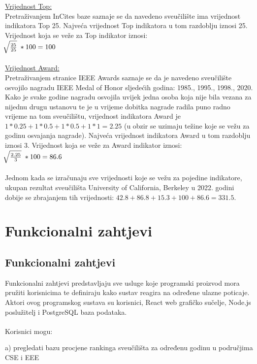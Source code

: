 \documentclass[times, utf8, zavrsni]{fer}
\begin{document}
\\
\\ \underline{Vrijednost Top:} 
\\ Pretraživanjem InCites baze saznaje se da navedeno sveučilište ima vrijednost indikatora Top 25. Najveća vrijednost Top indikatora u tom razdoblju iznosi 25.
Vrijednost koja se veže za Top indikator iznosi: \; \\ $\sqrt[\leftroot{-2}]{\frac{25}{25}} \; * 100 = 100$
\\
\\ \underline{Vrijednost Award:} 
\\ Pretraživanjem stranice IEEE Awards saznaje se da je navedeno sveučilište osvojilo nagradu IEEE Medal of Honor sljedećih godina: 1985., 1995., 1998., 2020. Kako je 
svake godine nagradu osvojila uvijek jedna osoba koja nije bila vezana za nijednu drugu ustanovu te je u vrijeme dobitka nagrade
radila puno radno vrijeme na tom sveučilištu, vrijednost 
indikatora Award je $1*0.25+1*0.5+1*0.5+1*1 = 2.25$ (u obzir se uzimaju težine koje se vežu za godinu osvajanja nagrade). Najveća vrijednost 
indikatora Award u tom razdoblju iznosi 3. Vrijednost koja se veže za Award indikator iznosi: \; \\ $\sqrt[\leftroot{-2}]{\frac{2.25}{3}} \; * 100 = 86.6$
\\\\Jednom kada se izračunaju sve vrijednosti koje se vežu za pojedine indikatore,
ukupan rezultat sveučilišta University of California, Berkeley u 2022. godini dobije se zbrajanjem tih vrijednosti: $42.8+86.8+15.3+100+86.6 = 331.5$.

\chapter{Funkcionalni zahtjevi}
\section{Funkcionalni zahtjevi}
Funkcionalni zahtjevi predstavljaju sve usluge koje programski proizvod mora pružiti korisnicima te definiraju kako sustav reagira na određene ulazne poticaje.
\\ Aktori ovog programskog sustava su korisnici, React web grafičko sučelje, Node.js poslužitelj i PostgreSQL baza podataka.
\\
\\Korisnici mogu:

a) pregledati bazu procjene rankinga sveučilišta za određenu godinu u područjima CSE i EEE
\end{document}
